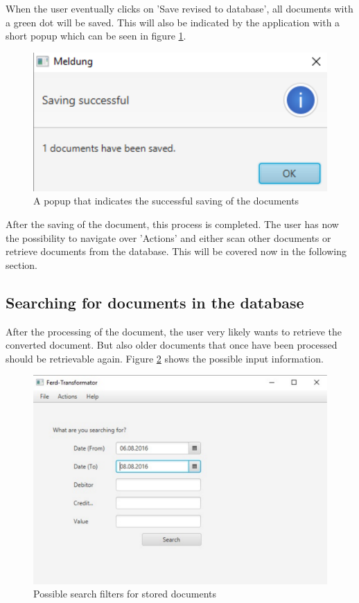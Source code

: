 When the user eventually clicks on 'Save revised to database', all documents with a green dot will be saved. This will also be indicated by the application with a short popup which can be seen in figure \ref{savingSuccessful}.

\begin{figure}[ht!]
\centering
\includegraphics[scale=0.6,natwidth=127,natheight=60]{Images/GUI/savingSuccessful.pdf}
\caption{A popup that indicates the successful saving of the documents \label{savingSuccessful}}
\end{figure}

After the saving of the document, this process is completed. The user has now the possibility to navigate over 'Actions' and either scan other documents or retrieve documents from the database. This will be covered now in the following section.

\subsection{Searching for documents in the database}
\label{sec5.8.2}

After the processing of the document, the user very likely wants to retrieve the converted document. But also older documents that once have been processed should be retrievable again.
Figure \ref{searchInDatabase} shows the possible input information. 

\begin{figure}[ht!]
\centering
\includegraphics[scale=0.6,natwidth=210,natheight=150]{Images/GUI/SearchInDatabase.pdf}
\caption{Possible search filters for stored documents \label{searchInDatabase}}
\end{figure}

